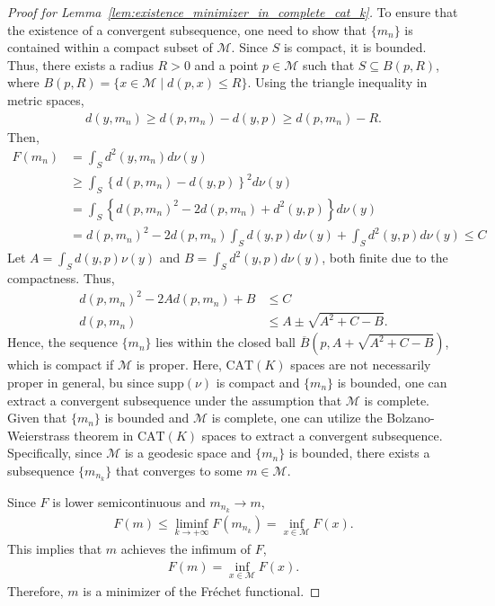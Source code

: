 \begin{proof}[Proof for Lemma~\ref{lem:existence_minimizer_in_complete_cat_k}]
    To ensure that the existence of a convergent subsequence, one need to show that $\{m_n\}$ is contained within a compact subset of $\mathcal{M}$.
    Since $S$ is compact, it is bounded.
    Thus, there exists a radius $R > 0$ and a point $p \in \mathcal{M}$ such that $S \subseteq B(p, R)$, where $B(p, R) = \{x \in \mathcal{M} \mid d(p, x) \leq R\}$.
    Using the triangle inequality in metric spaces,
    \begin{align*}
        d(y, m_n) \geq d(p, m_n) - d(y, p) \geq d(p, m_n) - R.
    \end{align*}
    Then,
    \begin{align*}
        F(m_n) &= \int_S d^2(y, m_n)d\nu(y) \\
        &\geq \int_S \left\{d(p, m_n) - d(y, p)\right\}^2 d\nu(y) \\
        &= \int_S \left\{d(p, m_n)^2 - 2d(p, m_n) + d^2(y, p)\right\}d\nu(y) \\
        &= d(p, m_n)^2 - 2d(p, m_n)\int_S d(y, p)d\nu(y) + \int_S d^2(y, p)d\nu(y) \leq C
    \end{align*}
    Let $A = \int_S d(y, p)\nu(y)$ and $B = \int_S d^2(y, p)d\nu(y)$, both finite due to the compactness.
    Thus,
    \begin{align*}
        d(p, m_n)^2 - 2A d(p, m_n) + B &\leq C \\
        d(p, m_n) &\leq A \pm \sqrt{A^2 + C - B}.
    \end{align*}
    Hence, the sequence $\{m_n\}$ lies within the closed ball $\overline{B}(p, A + \sqrt{A^2 + C - B})$, which is compact if $\mathcal{M}$ is proper.
    Here, $\mathrm{CAT}(K)$ spaces are not necessarily proper in general, bu since $\mathrm{supp}(\nu)$ is compact and $\{m_n\}$ is bounded, one can extract a convergent subsequence under the assumption that $\mathcal{M}$ is complete.
    Given that $\{m_n\}$ is bounded and $\mathcal{M}$ is complete, one can utilize the Bolzano-Weierstrass theorem in $\mathrm{CAT}(K)$ spaces to extract a convergent subsequence.
    Specifically, since $\mathcal{M}$ is a geodesic space and $\{m_n\}$ is bounded, there exists a subsequence $\{m_{n_k}\}$ that converges to some $m \in \mathcal{M}$.

    Since $F$ is lower semicontinuous and $m_{n_k} \to m$,
    \begin{align*}
        F(m) \leq \liminf_{k \to +\infty} F(m_{n_k}) = \inf_{x \in \mathcal{M}} F(x).
    \end{align*}
    This implies that $m$ achieves the infimum of $F$,
    \begin{align*}
        F(m) = \inf_{x \in \mathcal{M}} F(x).
    \end{align*}
    Therefore, $m$ is a minimizer of the Fréchet functional.
\end{proof}


